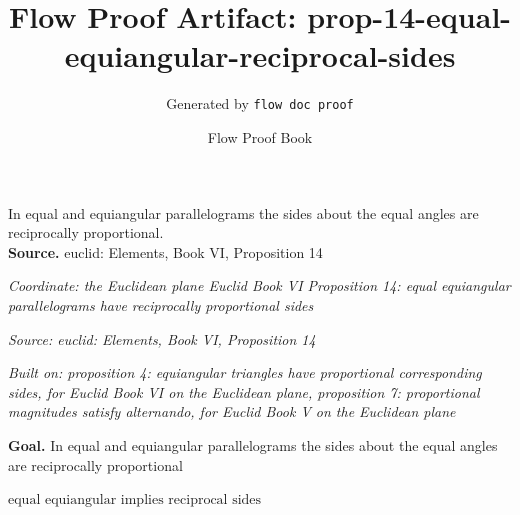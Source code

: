 \documentclass[11pt]{article}
\title{Flow Proof Artifact: prop-14-equal-equiangular-reciprocal-sides}
\author{Generated by \texttt{flow doc proof}}
\date{Flow Proof Book}
\theoremstyle{definition}
\begin{document}
\maketitle
In equal and equiangular parallelograms the sides about the equal angles are reciprocally proportional.\\[0.5em]
\textbf{Source.} euclid: Elements, Book VI, Proposition 14\\[0.5em]
\bigskip
{}\par
\smallskip\noindent\textit{Coordinate: the Euclidean plane \cdot Euclid Book VI \cdot Proposition 14: equal equiangular parallelograms have reciprocally proportional sides}\par
\smallskip\noindent\textit{Source: euclid: Elements, Book VI, Proposition 14}\par
\smallskip\noindent\textit{Built on: proposition 4: equiangular triangles have proportional corresponding sides, for Euclid Book VI on the Euclidean plane, proposition 7: proportional magnitudes satisfy alternando, for Euclid Book V on the Euclidean plane}\par
\medskip
\noindent\textbf{Goal.} In equal and equiangular parallelograms the sides about the equal angles are reciprocally proportional\par
\noindent$\displaystyle \text{equal equiangular implies reciprocal sides}$\par
\medskip
\noindent
\end{document}
